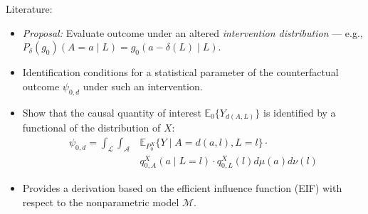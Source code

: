 \documentclass{beamer}
\newcommand{\E}{\mathbb{E}}
\begin{document}
\begin{frame}[c]{Literature: \cite{diaz2012population}}

\begin{center}
\begin{itemize}
  \itemsep10pt
  \item \textit{Proposal:} Evaluate outcome under an altered
    \textit{intervention distribution} --- e.g.,
    $P_{\delta}(g_0)(A = a \mid L) = g_0(a - \delta(L) \mid L)$.
  \item Identification conditions for a statistical parameter of the
    counterfactual outcome $\psi_{0,d}$ under such an intervention.
  \item Show that the causal quantity of interest $\E_0 \{Y_{d(A, L)}\}$ is
    identified by a functional of the distribution of $X$:
    \begin{align*}\label{eqn:identification2012}
      \psi_{0,d} = \int_{\mathcal{L}} \int_{\mathcal{A}} &\E_{P_0^X} \{Y \mid
        A = d(a, l), L = l\} \cdot \\ &q_{0, A}^X(a \mid L = l) \cdot
        q_{0, L}^X(l) d\mu(a)d\nu(l)
    \end{align*}
  \item Provides a derivation based on the efficient influence function (EIF)
    with respect to the nonparametric model $\mathcal{M}$.
\end{itemize}
\end{center}


\end{frame}
\end{document}
